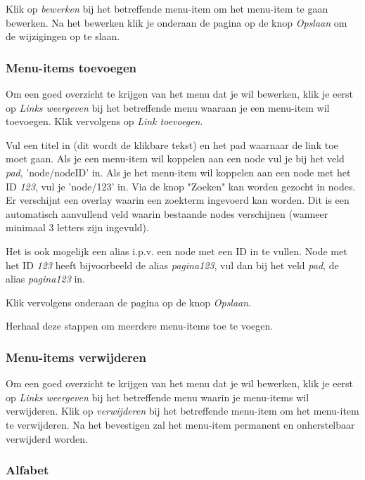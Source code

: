 Klik op \emph{bewerken} bij het betreffende menu-item om het menu-item te gaan bewerken. Na het bewerken klik je onderaan de pagina op de knop \emph{Opslaan} om de wijzigingen op te slaan.


\subsubsection{Menu-items toevoegen}\label{menuitemstoevoegen}

Om een goed overzicht te krijgen van het menu dat je wil bewerken, klik je eerst op \emph{Links weergeven} bij het betreffende menu waaraan je een menu-item wil toevoegen. Klik vervolgens op \emph{Link toevoegen}.

Vul een titel in (dit wordt de klikbare tekst) en het pad waarnaar de link toe moet gaan. Als je een menu-item wil koppelen aan een node vul je bij het veld \emph{pad}, 'node/nodeID' in. Als je het menu-item wil koppelen aan een node met het ID \emph{123}, vul je 'node/123' in. Via de knop "Zoeken" kan worden gezocht in nodes. Er verschijnt een overlay waarin een zoekterm ingevoerd kan worden. Dit is een automatisch aanvullend veld waarin bestaande nodes verschijnen (wanneer minimaal 3 letters zijn ingevuld).

Het is ook mogelijk een alias i.p.v. een node met een ID in te vullen. Node met het ID \emph{123} heeft bijvoorbeeld de alias \emph{pagina123}, vul dan bij het veld \emph{pad}, de alias \emph{pagina123} in.

Klik vervolgens onderaan de pagina op de knop \emph{Opslaan}.

Herhaal deze stappen om meerdere menu-items toe te voegen.

\subsubsection{Menu-items verwijderen}\label{menuitemsverwijderen}

Om een goed overzicht te krijgen van het menu dat je wil bewerken, klik je eerst op \emph{Links weergeven} bij het betreffende menu waarin je menu-items wil verwijderen. Klik op \emph{verwijderen} bij het betreffende menu-item om het menu-item te verwijderen. Na het bevestigen zal het menu-item permanent en onherstelbaar verwijderd worden.


\subsubsection{Alfabet}\label{alfabet}

